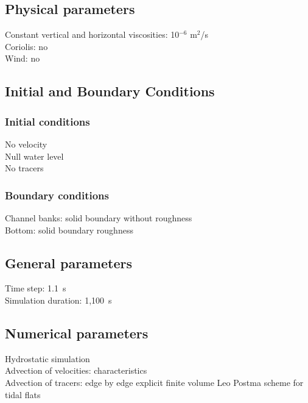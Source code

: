 \subsection{Physical parameters}
%
Constant vertical and horizontal viscosities: 10$^{-6}$ m$^2$/s\\
Coriolis: no\\
Wind: no
%
%
%
%
%
%
\subsection{Initial and Boundary Conditions}
%
\subsubsection{Initial conditions}
%
No velocity\\
Null water level\\
No tracers
%
\subsubsection{Boundary conditions}
%
Channel banks: solid boundary without roughness\\
Bottom: solid boundary roughness
%
\subsection{General parameters}
%
Time step: 1.1~s\\
Simulation duration: 1,100~s
%
%
%
\subsection{Numerical parameters}
%
Hydrostatic simulation\\
Advection of velocities: characteristics\\
Advection of tracers: edge by edge explicit finite volume Leo Postma
scheme for tidal flats
%
